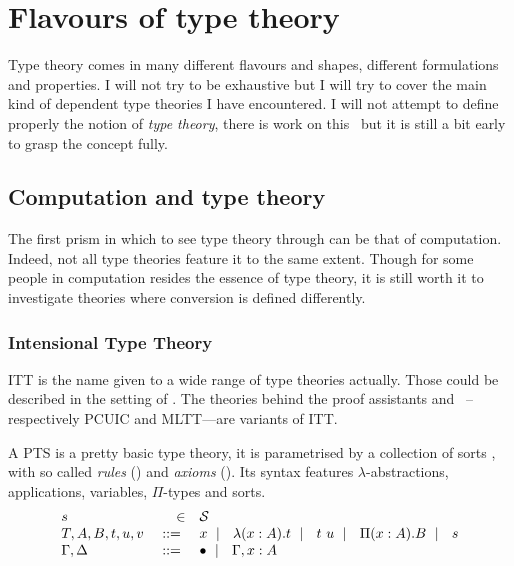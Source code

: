 \chapter{Flavours of type theory}

Type theory comes in many different flavours and shapes, different formulations
and properties. I will not try to be exhaustive but I will try to cover the
main kind of dependent type theories I have encountered.
I will not attempt to define properly the notion of \emph{type theory},
there is work on this~\misref{} but it is still a bit early to grasp the
concept fully.

\section{Computation and type theory}

The first prism in which to see type theory through can be that of computation.
Indeed, not all type theories feature it to the same extent. Though for some
people in computation resides the essence of type theory, it is still worth
it to investigate theories where conversion is defined differently.

\subsection{Intensional Type Theory}

\acrfull{ITT} is the name given to a wide range of type theories actually.
Those could be described in the setting of .
The theories behind the proof assistants \Coq and
\Agda~--respectively \acrfull{PCUIC} and
\acrfull{MLTT}---are variants of \acrshort{ITT}.

A \acrshort{PTS} is a pretty basic type theory, it is parametrised by a
collection of sorts \cS, with so called \emph{rules}
(\Rl) and \emph{axioms} (\Ax).
Its syntax features \(\lambda\)-abstractions, applications, variables,
\(\Pi\)-types and sorts.
%
\[
  \begin{array}{lrl}
    s &\in& \mathcal{S} \\
    T,A,B,t,u,v &\ \mathrel{{:}{:}{=}}\ & x \ \mid\ \  \lambda (x:A). t \ \mid\ \  t\ u
    \ \mid\ \  \Pi (x : A). B \ \mid\ \  s \\
    \Gamma, \Delta &\ \mathrel{{:}{:}{=}}\ & \bullet \ \mid\ \  \Gamma, x:A
  \end{array}
\]

